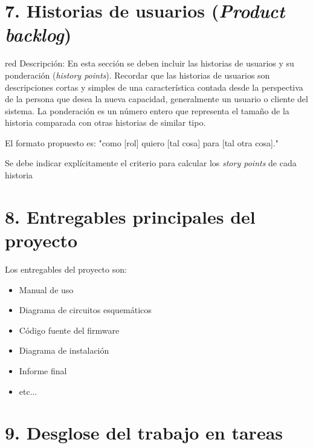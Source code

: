 \documentclass[
11pt, %
]{charter}
\begin{document}
\section{7. Historias de usuarios (\textit{Product backlog})}
\label{sec:backlog}

\begin{consigna}{red}
Descripción: En esta sección se deben incluir las historias de usuarios y su ponderación (\textit{history points}). Recordar que las historias de usuarios son descripciones cortas y simples de una característica contada desde la perspectiva de la persona que desea la nueva capacidad, generalmente un usuario o cliente del sistema. La ponderación es un número entero que representa el tamaño de la historia comparada con otras historias de similar tipo.

El formato propuesto es: "como [rol] quiero [tal cosa] para [tal otra cosa]."

Se debe indicar explícitamente el criterio para calcular los \textit{story points} de cada historia
\end{consigna}

\section{8. Entregables principales del proyecto}
\label{sec:entregables}

Los entregables del proyecto son:

\begin{itemize}
	\item Manual de uso
	\item Diagrama de circuitos esquemáticos
	\item Código fuente del firmware
	\item Diagrama de instalación
	\item Informe final
	\item etc...
\end{itemize}


\section{9. Desglose del trabajo en tareas}
\label{sec:wbs}
\end{document}

